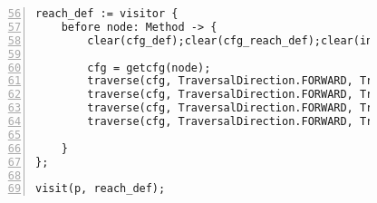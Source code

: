 \begin{figure}[ht!]
\begin{lstlisting}[numbers=left, tabsize=4, caption={Loop invariant code motion},label={lst:lic-code}, firstline = 56, firstnumber = 56, lastline = 108]
reach_def := visitor {
	before node: Method -> {
		clear(cfg_def);clear(cfg_reach_def);clear(init);clear(loops);clear(codemotion);clear(loop_invariant);

		cfg = getcfg(node);
		traverse(cfg, TraversalDirection.FORWARD, TraversalKind.HYBRID, cfg_def);
		traverse(cfg, TraversalDirection.FORWARD, TraversalKind.HYBRID, init);
		traverse(cfg, TraversalDirection.FORWARD, TraversalKind.HYBRID, cfg_reach_def, fixp1);
		traverse(cfg, TraversalDirection.FORWARD, TraversalKind.HYBRID, loop_invariant);
			
	}
};

visit(p, reach_def);
\end{lstlisting}
\end{figure}